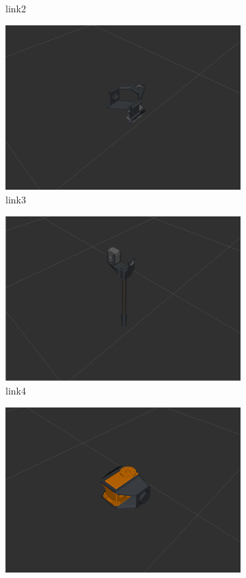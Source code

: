 \begin{figure}
\begin{subfigure}[b]{0.2\linewidth}
    \caption{link2}
  \end{subfigure}
  \begin{subfigure}[b]{0.2\linewidth}
    \includegraphics[width=\linewidth]{link3.png}
    \caption{link3}
  \end{subfigure}
  \begin{subfigure}[b]{0.2\linewidth}
    \includegraphics[width=\linewidth]{link4.png}
    \caption{link4}
  \end{subfigure}
  \begin{subfigure}[b]{0.2\linewidth}
    \includegraphics[width=\linewidth]{link5.png}

\end{subfigure}
\end{figure}
